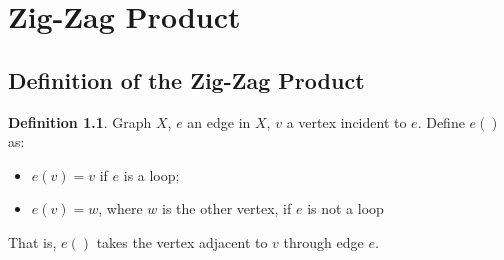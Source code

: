 \documentclass{book}
\theoremstyle{definition}
\newtheorem{definition}[lemma]{Definition}
\theoremstyle{remarkstyle}
\begin{document}
\setcounter{chapter}{4}
\chapter{Zig-Zag Product}



\section{Definition of the Zig-Zag Product}
\begin{definition}
    Graph $X$, $e$ an edge in $X$, $v$ a vertex incident to $e$. Define $e()$ as:
    \begin{itemize}
        \item $e(v)=v$ if $e$ is a loop;
        \item $e(v)=w$, where $w$ is the other vertex, if $e$ is not a loop
    \end{itemize}
    That is, $e()$ takes the vertex adjacent to $v$ through edge $e$. \newline
\end{definition}
\end{document}
